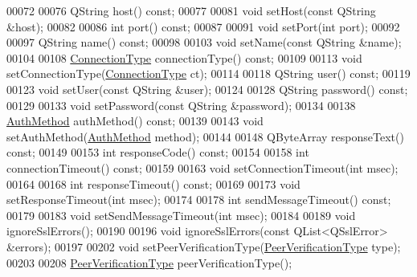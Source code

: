 \begin{DoxyCode}
00072 
00076     QString host() \textcolor{keyword}{const};
00077 
00081     \textcolor{keywordtype}{void} setHost(\textcolor{keyword}{const} QString &host);
00082 
00086     \textcolor{keywordtype}{int} port() \textcolor{keyword}{const};
00087 
00091     \textcolor{keywordtype}{void} setPort(\textcolor{keywordtype}{int} port);
00092 
00097     QString name() \textcolor{keyword}{const};
00098 
00103     \textcolor{keywordtype}{void} setName(\textcolor{keyword}{const} QString &name);
00104 
00108     \hyperlink{class_simple_mail_1_1_sender_a89e6a9572b306441237f6b6635729d1a}{ConnectionType} connectionType() \textcolor{keyword}{const};
00109 
00113     \textcolor{keywordtype}{void} setConnectionType(\hyperlink{class_simple_mail_1_1_sender_a89e6a9572b306441237f6b6635729d1a}{ConnectionType} ct);
00114 
00118     QString user() \textcolor{keyword}{const};
00119 
00123     \textcolor{keywordtype}{void} setUser(\textcolor{keyword}{const} QString &user);
00124 
00128     QString password() \textcolor{keyword}{const};
00129 
00133     \textcolor{keywordtype}{void} setPassword(\textcolor{keyword}{const} QString &password);
00134 
00138     \hyperlink{class_simple_mail_1_1_sender_af50defb714bc3e95f47c71a9ba6ee6bb}{AuthMethod} authMethod() \textcolor{keyword}{const};
00139 
00143     \textcolor{keywordtype}{void} setAuthMethod(\hyperlink{class_simple_mail_1_1_sender_af50defb714bc3e95f47c71a9ba6ee6bb}{AuthMethod} method);
00144 
00148     QByteArray responseText() \textcolor{keyword}{const};
00149 
00153     \textcolor{keywordtype}{int} responseCode() \textcolor{keyword}{const};
00154 
00158     \textcolor{keywordtype}{int} connectionTimeout() \textcolor{keyword}{const};
00159 
00163     \textcolor{keywordtype}{void} setConnectionTimeout(\textcolor{keywordtype}{int} msec);
00164 
00168     \textcolor{keywordtype}{int} responseTimeout() \textcolor{keyword}{const};
00169 
00173     \textcolor{keywordtype}{void} setResponseTimeout(\textcolor{keywordtype}{int} msec);
00174     
00178     \textcolor{keywordtype}{int} sendMessageTimeout() \textcolor{keyword}{const};
00179 
00183     \textcolor{keywordtype}{void} setSendMessageTimeout(\textcolor{keywordtype}{int} msec);
00184 
00189     \textcolor{keywordtype}{void} ignoreSslErrors();
00190 
00196     \textcolor{keywordtype}{void} ignoreSslErrors(\textcolor{keyword}{const} QList<QSslError> &errors);
00197 
00202     \textcolor{keywordtype}{void} setPeerVerificationType(\hyperlink{class_simple_mail_1_1_sender_acfbcf388ab7c26cd41c5c77601fe8804}{PeerVerificationType} type);
00203 
00208     \hyperlink{class_simple_mail_1_1_sender_acfbcf388ab7c26cd41c5c77601fe8804}{PeerVerificationType} peerVerificationType();

\end{DoxyCode}

